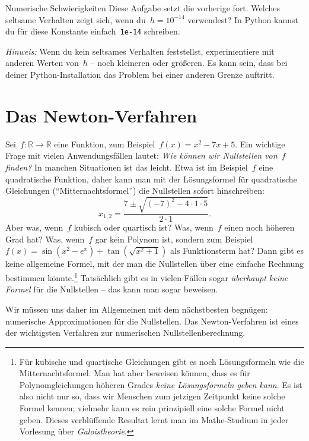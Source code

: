 \documentclass{blatt}
\newcommand{\RR}{\mathbb{R}}
\begin{document}
\begin{aufgabe}{Numerische Schwierigkeiten}
Diese Aufgabe setzt die vorherige fort. Welches seltsame Verhalten zeigt sich,
wenn du~$h = 10^{-14}$ verwendest? In Python kannst du für diese Konstante
einfach~\texttt{1e-14} schreiben.

\emph{Hinweis:} Wenn du kein seltsames Verhalten feststellst, experimentiere
mit anderen Werten von~$h$ -- noch kleineren oder größeren. Es kann sein, dass
bei deiner Python-Installation das Problem bei einer anderen Grenze auftritt.
\end{aufgabe}


\section{Das Newton-Verfahren}

Sei~$f : \RR \to \RR$ eine Funktion, zum Beispiel~$f(x) = x^2 - 7x + 5$. Ein
wichtige Frage mit vielen Anwendungsfällen lautet: \emph{Wie können wir
Nullstellen von~$f$ finden?} In manchen Situationen ist das leicht. Etwa ist im
Beispiel~$f$ eine quadratische Funktion, daher kann man mit der Lösungsformel
für quadratische Gleichungen ("`Mitternachtsformel"') die Nullstellen sofort
hinschreiben:
\[ x_{1,2} = \frac{7 \pm \sqrt{(-7)^2 - 4 \cdot 1 \cdot 5}}{2 \cdot 1}. \]
Aber was, wenn~$f$ kubisch oder quartisch ist? Was, wenn~$f$ einen noch höheren
Grad hat? Was, wenn~$f$ gar kein Polynom ist, sondern zum Beispiel~$f(x) =
\sin(x^2 - e^x) + \tan(\sqrt{x^2 + 1})$ als Funktionsterm hat? Dann gibt es
keine allgemeine Formel, mit der man die Nullstellen über eine einfache
Rechnung bestimmen könnte.\footnote{Für kubische und quartische Gleichungen
gibt es noch Lösungsformeln wie die Mitternachtsformel. Man hat aber beweisen
können, dass es für Polynomgleichungen höheren Grades \emph{keine
Lösungsformeln geben kann}. Es ist also nicht nur so, dass wir Menschen zum
jetzigen Zeitpunkt keine solche Formel kennen; vielmehr kann es rein
prinzipiell eine solche Formel nicht geben. Dieses verblüffende Resultat lernt
man im Mathe-Studium in jeder Vorlesung über \emph{Galoistheorie}.}
Tatsächlich gibt es in vielen Fällen sogar \emph{überhaupt keine Formel} für
die Nullstellen -- das kann man sogar beweisen.

Wir müssen uns daher im Allgemeinen mit dem nächstbesten begnügen: numerische
Approximationen für die Nullstellen. Das Newton-Verfahren ist eines der
wichtigsten Verfahren zur numerischen Nullstellenberechnung.

\newcommand{\Ans}{\texttt{Ans}\xspace}
\end{document}
